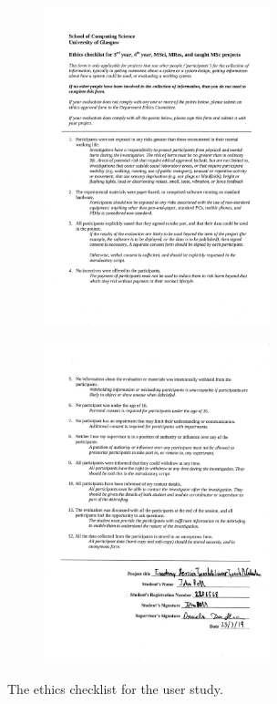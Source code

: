 \documentclass{l4proj}
\begin{document}
\begin{appendices}
\begin{figure}[H]
\begin{subfigure}{\textwidth}
\centering
\includegraphics[width=0.72\textwidth]{images/EthicsChecklistPage1.pdf}
\end{subfigure}
\end{figure}
\begin{figure}[H]
\ContinuedFloat
\begin{subfigure}{\textwidth}
\centering
\includegraphics[width=0.72\textwidth]{images/EthicsChecklistPage2.pdf}
\end{subfigure}
\caption{The ethics checklist for the user study.}
\label{fig:ethicsChecklist}
\end{figure}


\end{appendices}
\end{document}
